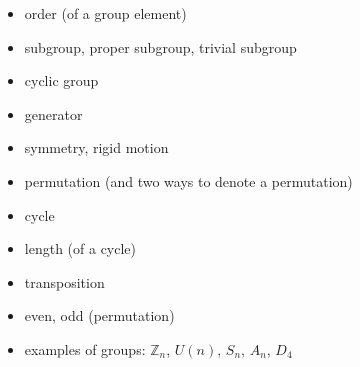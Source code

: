 \documentclass[12pt]{article}
\begin{document}
\begin{itemize}
\item order (of a group element)
\item subgroup, proper subgroup, trivial subgroup
\item cyclic group
\item generator
\item symmetry, rigid motion
\item permutation (and two ways to denote a permutation)
\item cycle
\item length (of a cycle)
\item transposition
\item even, odd (permutation)
\item examples of groups: $\mathbb{Z}_n$, $U(n)$, $S_n$, $A_n$, $D_4$
\end{itemize}
\end{document}
